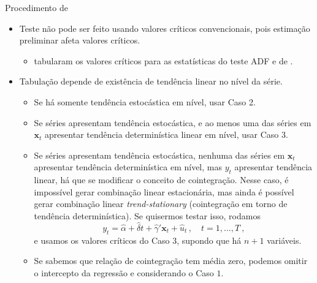 \documentclass[11pt]{beamer}
\begin{document}
\begin{frame}{Procedimento de \citet{Phillips1990}}
	\begin{itemize}
		\item Teste não pode ser feito usando valores críticos convencionais, pois estimação preliminar afeta valores críticos.
		\begin{itemize}
			\item \citet{Phillips1990} tabularam os valores críticos para as estatísticas do teste ADF e de \citet{Phillips1988}.
		\end{itemize}
		\item Tabulação depende de existência de tendência linear no nível da série.
		\begin{itemize}
			\item Se há somente tendência estocástica em nível, usar {\color{blue}Caso 2}.
			\item  Se séries apresentam tendência estocástica, e ao menos uma das séries em $\boldsymbol{x}_t$ apresentar tendência determinística linear em nível, usar {\color{blue}Caso 3}.
			\item Se séries apresentam tendência estocástica, nenhuma das séries em $\boldsymbol{x}_t$ apresentar tendência determinística em nível, mas $y_t$ apresentar tendência linear, há que se modificar o conceito de cointegração. Nesse caso, é impossível gerar combinação linear estacionária, mas ainda é possível gerar combinação linear \textit{ trend-stationary }(cointegração em torno de tendência determinística). Se quisermos testar isso, rodamos 
					$$y_t =\hat\alpha + \hat \delta t + \hat{{\gamma}}'\boldsymbol{x}_t + \hat{u}_t \, , \quad t=1,\ldots, T\ ,$$
			e usamos os valores críticos do {\color{blue}Caso 3, supondo que há $n+1$ variáveis}.
			\item Se sabemos que relação de cointegração tem média zero, podemos omitir o intercepto da regressão e considerando o {\color{blue}Caso $1$}.
		\end{itemize}
	\end{itemize}
\end{frame}
\end{document}
